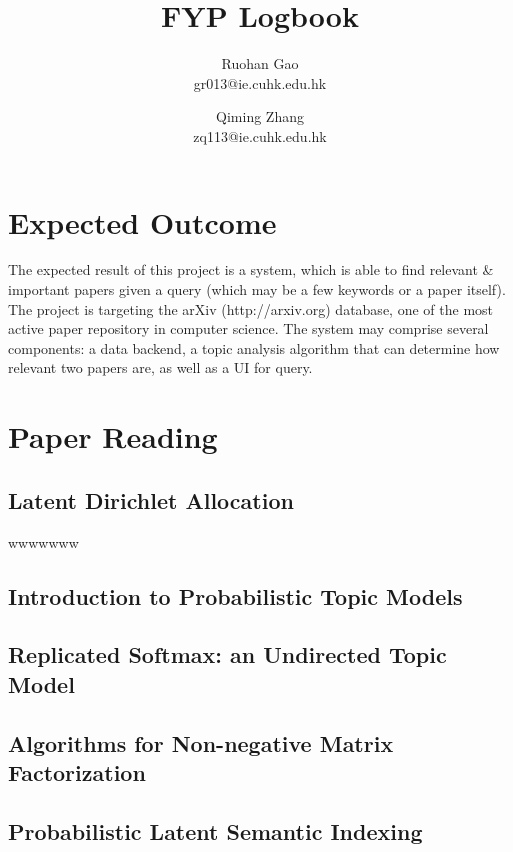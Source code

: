 \documentclass[10pt]{article}
\begin{document}
\title{FYP Logbook}
\author{
		Ruohan Gao \\ gr013@ie.cuhk.edu.hk
		\and
		Qiming Zhang \\ zq113@ie.cuhk.edu.hk
}
\maketitle

\section{Expected Outcome}
The expected result of this project is a system, which is able to find relevant \& important papers given a query (which may be a few keywords or a paper itself). The project is targeting the arXiv (http://arxiv.org) database, one of the most active paper repository in computer science. The system may comprise several components: a data backend, a topic analysis algorithm that can determine how relevant two papers are, as well as a UI for query.

\section{Paper Reading}

\subsection{Latent Dirichlet Allocation \cite{label1}}
wwwwwww
\subsection{Introduction to Probabilistic Topic Models \cite{label2}}

\subsection{Replicated Softmax: an Undirected Topic Model \cite{label3}}

\subsection{Algorithms for Non-negative Matrix Factorization \cite{label4}}

\subsection{Probabilistic Latent Semantic Indexing \cite{label5}}
\end{document}
